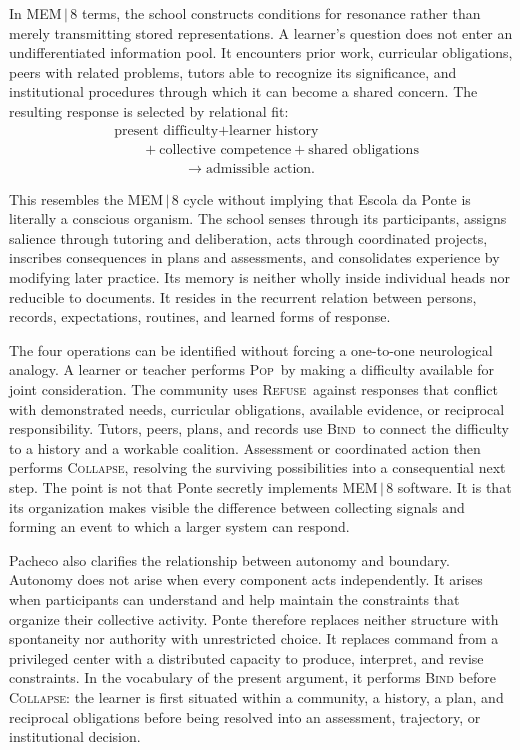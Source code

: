 \documentclass[11pt]{article}
\newcommand{\Pop}{\textsc{Pop}}
\newcommand{\Refuse}{\textsc{Refuse}}
\newcommand{\Bind}{\textsc{Bind}}
\newcommand{\Collapse}{\textsc{Collapse}}
\begin{document}
In MEM\,$|$\,8 terms, the school constructs conditions for resonance rather than merely transmitting stored representations. A learner's question does not enter an undifferentiated information pool. It encounters prior work, curricular obligations, peers with related problems, tutors able to recognize its significance, and institutional procedures through which it can become a shared concern. The resulting response is selected by relational fit:
\[
\begin{aligned}
&\text{present difficulty}+\text{learner history} \\
&\qquad +\text{collective competence}+\text{shared obligations} \\
&\hspace{5em}\longrightarrow \text{admissible action}.
\end{aligned}
\]

This resembles the MEM\,$|$\,8 cycle without implying that Escola da Ponte is literally a conscious organism. The school senses through its participants, assigns salience through tutoring and deliberation, acts through coordinated projects, inscribes consequences in plans and assessments, and consolidates experience by modifying later practice. Its memory is neither wholly inside individual heads nor reducible to documents. It resides in the recurrent relation between persons, records, expectations, routines, and learned forms of response.

The four operations can be identified without forcing a one-to-one neurological analogy. A learner or teacher performs \Pop\ by making a difficulty available for joint consideration. The community uses \Refuse\ against responses that conflict with demonstrated needs, curricular obligations, available evidence, or reciprocal responsibility. Tutors, peers, plans, and records use \Bind\ to connect the difficulty to a history and a workable coalition. Assessment or coordinated action then performs \Collapse, resolving the surviving possibilities into a consequential next step. The point is not that Ponte secretly implements MEM\,$|$\,8 software. It is that its organization makes visible the difference between collecting signals and forming an event to which a larger system can respond.

Pacheco also clarifies the relationship between autonomy and boundary. Autonomy does not arise when every component acts independently. It arises when participants can understand and help maintain the constraints that organize their collective activity. Ponte therefore replaces neither structure with spontaneity nor authority with unrestricted choice. It replaces command from a privileged center with a distributed capacity to produce, interpret, and revise constraints. In the vocabulary of the present argument, it performs \textsc{Bind} before \textsc{Collapse}: the learner is first situated within a community, a history, a plan, and reciprocal obligations before being resolved into an assessment, trajectory, or institutional decision.
\end{document}
